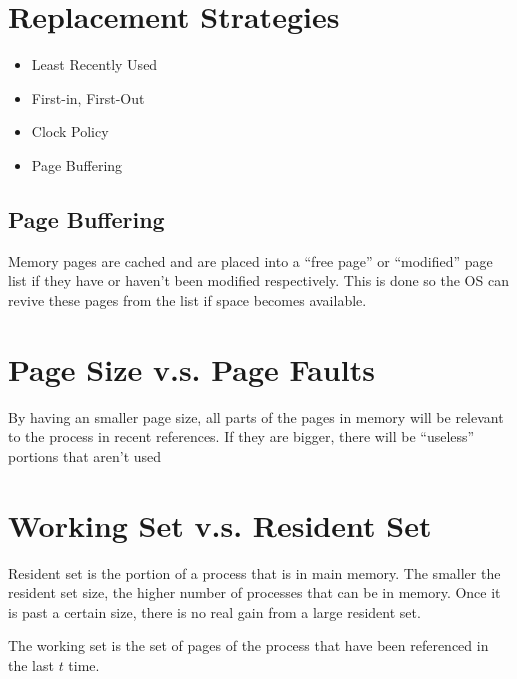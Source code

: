     \section{Replacement Strategies} %
    \label{sec:replacement_allocation_strategies}
        \begin{itemize}
            \item Least Recently Used
            \item First-in, First-Out
            \item Clock Policy
            \item Page Buffering
        \end{itemize}
    \subsection{Page Buffering} %
    \label{subsec:page_buffering}
        Memory pages are cached and are placed into a ``free page'' or
        ``modified'' page list if they have or haven't been modified
        respectively. This is done so the OS can revive these pages from the
        list if space becomes available.

    \section{Page Size v.s. Page Faults} %
    \label{sec:page_size_v_s_page_faults}
    By having an smaller page size, all parts of the pages in memory will
    be relevant to the process in recent references. If they are bigger, there
    will be ``useless'' portions that aren't used

    \section{Working Set v.s. Resident Set} %
    \label{sec:working_set_v_s_resident_set}
    Resident set is the portion of a process that is in main memory.
    The smaller the resident set size, the higher number of processes that can
    be in memory.
    Once it is past a certain size, there is no real gain from a large resident
    set.

    The working set is the set of pages of the process that have been referenced
    in the last $t$ time.

